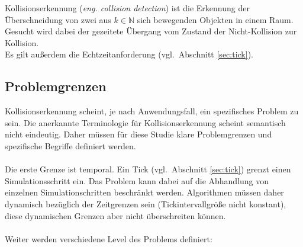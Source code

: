 Kollisionserkennung (\textit{eng. collision detection}) ist die Erkennung der Überschneidung von zwei aus $k\in\mathbb{N}$ sich bewegenden Objekten in einem Raum.
Gesucht wird dabei der gezeitete Übergang vom Zustand der Nicht-Kollision zur Kollision.\\
Es gilt außerdem die Echtzeitanforderung (vgl.~Abschnitt \ref{sec:tick}).
\\
\subsection{Problemgrenzen}
Kollisionserkennung scheint, je nach Anwendungsfall, ein spezifisches Problem zu sein. Die anerkannte Terminologie für Kollisionserkennung scheint semantisch nicht eindeutig. Daher müssen für diese Studie klare Problemgrenzen und spezifische Begriffe definiert werden.\\
\\
Die erste Grenze ist temporal. Ein Tick (vgl.~Abschnitt \ref{sec:tick}) grenzt einen Simulationsschritt ein. Das Problem kann dabei auf die Abhandlung von einzelnen Simulationschritten beschränkt werden. Algorithmen müssen daher dynamisch bezüglich der Zeitgrenzen sein (Tickintervallgröße nicht konstant), diese dynamischen Grenzen aber nicht überschreiten können.\\
\\
Weiter werden verschiedene Level des Problems definiert:
